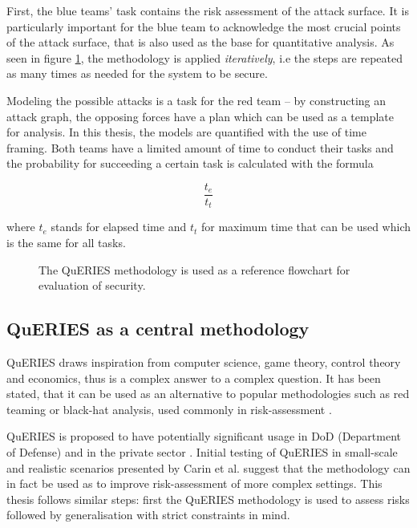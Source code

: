 First, the blue teams' task contains the risk assessment of the attack
surface. It is particularly important for the blue team to acknowledge
the most crucial points of the attack surface, that is also used as
the base for quantitative analysis. As seen in figure
\ref{queries}, the methodology is applied \textit{iteratively}, i.e
the steps are repeated as many times as needed for the system to be
secure.

Modeling the possible attacks is a task for the red team – by
constructing an attack graph, the opposing forces have a plan which
can be used as a template for analysis. In this thesis, the models are quantified with the use of time
framing. Both teams have a limited amount of time to conduct their
tasks and the probability for succeeding a certain task is calculated
with the formula

\[ \frac{t_e}{t_t} \]

where \(t_e\) stands for elapsed time and \(t_t\) for maximum time
that can be used which is the same for all tasks.

\begin{figure}[t!]
\centerline{}
\caption[QuERIES as a flowchart]{The QuERIES methodology is used as a reference flowchart for
  evaluation of security. \cite{hughes2013quantitative}}
\label{queries}
\end{figure}
\subsection{QuERIES as a central methodology} \label{queriesasmethodology}

QuERIES draws inspiration from computer science, game theory, control
theory and economics, thus is a complex answer to a complex
question. It has been stated, that it can be used as an alternative to
popular methodologies such as red teaming or black-hat analysis, used
commonly in risk-assessment \cite{carin2008cybersecurity}.

QuERIES is proposed to have potentially significant usage in DoD
(Department of Defense) and in the private sector
\cite{carin2008cybersecurity}. Initial testing of QuERIES in
small-scale and realistic scenarios presented by Carin et al. \cite{carin2008cybersecurity} suggest
that the methodology can in fact be used as to improve risk-assessment of
more complex settings. This thesis
follows similar steps: first the QuERIES methodology is used to assess
risks followed by generalisation with strict constraints in mind.

